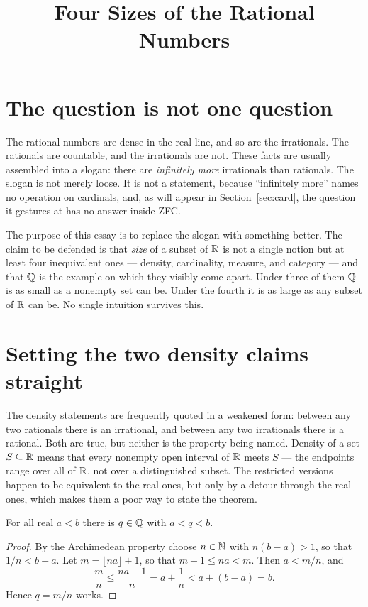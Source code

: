 \documentclass{essay}
\title{Four Sizes of the Rational Numbers}
\author{}
\date{}
\begin{document}
\maketitle

\section{The question is not one question}

The rational numbers are dense in the real line, and so are the
irrationals. The rationals are countable, and the irrationals are not.
These facts are usually assembled into a slogan: there are
\emph{infinitely more} irrationals than rationals. The slogan is not
merely loose. It is not a statement, because ``infinitely more'' names
no operation on cardinals, and, as will appear in Section~\ref{sec:card},
the question it gestures at has no answer inside ZFC.

The purpose of this essay is to replace the slogan with something
better. The claim to be defended is that \emph{size} of a subset of
\(\mathbb{R}\) is not a single notion but at least four inequivalent ones ---
density, cardinality, measure, and category --- and that \(\Q\) is the
example on which they visibly come apart. Under three of them \(\Q\) is
as small as a nonempty set can be. Under the fourth it is as large as
any subset of \(\mathbb{R}\) can be. No single intuition survives this.

\section{Setting the two density claims straight}

The density statements are frequently quoted in a weakened form:
between any two rationals there is an irrational, and between any two
irrationals there is a rational. Both are true, but neither is the
property being named. Density of a set \(S \subseteq \mathbb{R}\) means that
every nonempty open interval of \(\mathbb{R}\) meets \(S\) --- the endpoints range
over all of \(\mathbb{R}\), not over a distinguished subset. The restricted
versions happen to be equivalent to the real ones, but only by a
detour through the real ones, which makes them a poor way to state the
theorem.

\begin{theorem}[Density of \(\Q\)]
  For all real \(a < b\) there is \(q \in \mathbb{Q}\) with \(a < q < b\).
\end{theorem}

\begin{proof}
  By the Archimedean property choose \(n \in \mathbb{N}\) with \(n(b - a) > 1\), so
  that \(1/n < b - a\). Let \(m = \lfloor na \rfloor + 1\), so that
  \(m - 1 \leq na < m\). Then \(a < m/n\), and
  \[ \frac{m}{n} \leq \frac{na + 1}{n} = a + \frac{1}{n} < a + (b - a) = b . \]
  Hence \(q = m/n\) works.
\end{proof}
\end{document}
